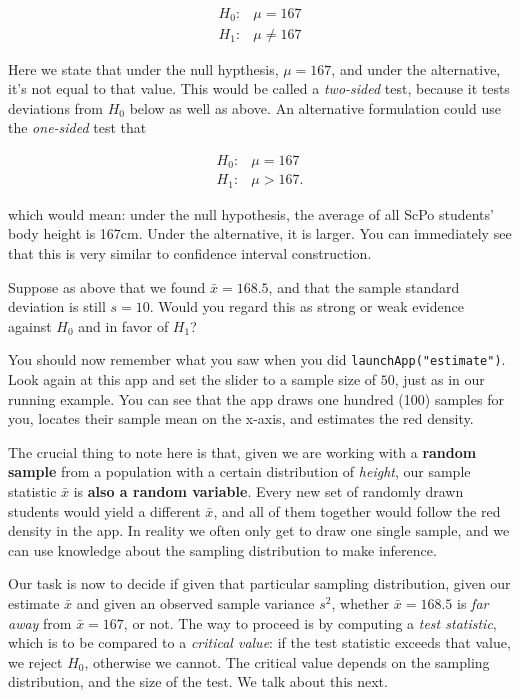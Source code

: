 \documentclass[]{book}
\newenvironment{note}{\begin{tcolorbox}[colback=blue!5!white,colframe=blue!75!black]}{\end{tcolorbox}}
\begin{document}
\begin{align}
H_0:& \mu = 167\\
H_1:& \mu \neq 167
\end{align}

Here we state that under the null hypthesis, \(\mu = 167\), and under the alternative, it's not equal to that value. This would be called a \emph{two-sided} test, because it tests deviations from \(H_0\) below as well as above. An alternative formulation could use the \emph{one-sided} test that

\begin{align}
H_0:& \mu = 167\\
H_1:& \mu > 167.
\end{align}

which would mean: under the null hypothesis, the average of all ScPo students' body height is 167cm. Under the alternative, it is larger. You can immediately see that this is very similar to confidence interval construction.

Suppose as above that we found \(\bar{x} = 168.5\), and that the sample standard deviation is still \(s=10\). Would you regard this as strong or weak evidence against \(H_0\) and in favor of \(H_1\)?

You should now remember what you saw when you did \texttt{launchApp("estimate")}. Look again at this app and set the slider to a sample size of \(50\), just as in our running example. You can see that the app draws one hundred (100) samples for you, locates their sample mean on the x-axis, and estimates the red density.

\begin{note}
The crucial thing to note here is that, given we are working with a
\textbf{random sample} from a population with a certain distribution of
\emph{height}, our sample statistic \(\bar{x}\) is \textbf{also a random
variable}. Every new set of randomly drawn students would yield a
different \(\bar{x}\), and all of them together would follow the red
density in the app. In reality we often only get to draw one single
sample, and we can use knowledge about the sampling distribution to make
inference.
\end{note}

Our task is now to decide if given that particular sampling distribution, given our estimate \(\bar{x}\) and given an observed sample variance \(s^2\), whether \(\bar{x} = 168.5\) is \emph{far away} from \(\bar{x} = 167\), or not. The way to proceed is by computing a \emph{test statistic}, which is to be compared to a \emph{critical value}: if the test statistic exceeds that value, we reject \(H_0\), otherwise we cannot. The critical value depends on the sampling distribution, and the size of the test. We talk about this next.
\end{document}
